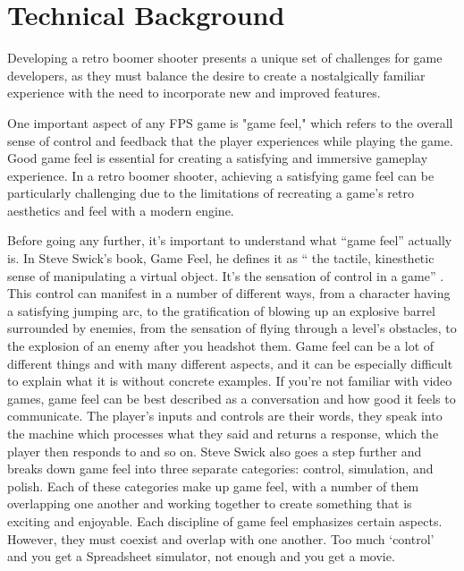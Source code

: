\documentclass[10pt,twocolumn]{article}
\begin{document}
\section{Technical Background}
Developing a retro boomer shooter presents a unique set of challenges for game developers, as they must balance the desire to create a nostalgically familiar experience with the need to incorporate new and improved features.

One important aspect of any FPS game is "game feel," which refers to the overall sense of control and feedback that the player experiences while playing the game. Good game feel is essential for creating a satisfying and immersive gameplay experience. In a retro boomer shooter, achieving a satisfying game feel can be particularly challenging due to the limitations of recreating a game's retro aesthetics and feel with a modern engine.

Before going any further, it’s important to understand what “game feel” actually is. In Steve Swick’s book, Game Feel, he defines it as “ the tactile, kinesthetic sense of manipulating a virtual object. It’s the sensation of control in a game” \cite{SteveSwickGame}. This control can manifest in a number of different ways, from a character having a satisfying jumping arc, to the gratification of blowing up an explosive barrel surrounded by enemies, from the sensation of flying through a level’s obstacles, to the explosion of an enemy after you headshot them. Game feel can be a lot of different things and with many different aspects, and it can be especially difficult to explain what it is without concrete examples. If you’re not familiar with video games, game feel can be best described as a conversation and how good it feels to communicate. The player's inputs and controls are their words, they speak into the machine which processes what they said and returns a response, which the player then responds to and so on. Steve Swick also goes a step further and breaks down game feel into three separate categories: control, simulation, and polish. Each of these categories make up game feel, with a number of them overlapping one another and working together to create something that is exciting and enjoyable. Each discipline of game feel emphasizes certain aspects. However, they must coexist and overlap with one another. Too much ‘control’ and you get a Spreadsheet simulator, not enough and you get a movie.
\end{document}
